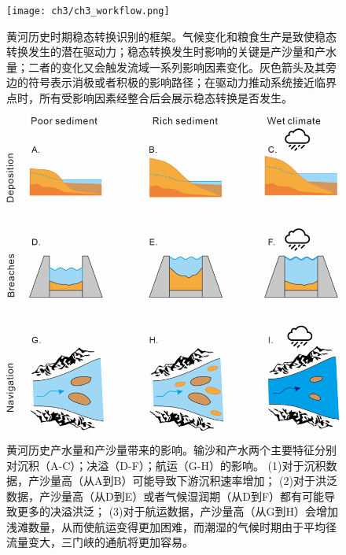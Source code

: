 
\begin{figure}[H] %
    \centering
    \texttt{[image: ch3/ch3\_workflow.png]}
    \caption[黄河历史时期稳态转换识别的框架]{黄河历史时期稳态转换识别的框架。气候变化和粮食生产是致使稳态转换发生的潜在驱动力；稳态转换发生时影响的关键是产沙量和产水量；二者的变化又会触发流域一系列影响因素变化。灰色箭头及其旁边的符号表示消极或者积极的影响路径；在驱动力推动系统接近临界点时，所有受影响因素经整合后会展示稳态转换是否发生。}
    \label{fig:ch3_regime_shift_detect}
\end{figure}

\begin{figure}[H] %
    \centering
    \includegraphics{img/ch3/ch3_impacts.png}
    \caption[黄河历史产水量和产沙量带来的影响]{黄河历史产水量和产沙量带来的影响。输沙和产水两个主要特征分别对沉积（A-C）；决溢（D-F）；航运（G-H）的影响。
    (1)对于沉积数据，产沙量高（从A到B）可能导致下游沉积速率增加\cite{xu2003a}；
    (2)对于洪泛数据，产沙量高（从D到E）或者气候湿润期（从D到F）都有可能导致更多的决溢洪泛\cite{chen2012}；
    (3)对于航运数据，产沙量高（从G到H）会增加浅滩数量，从而使航运变得更加困难，而潮湿的气候时期由于平均径流量变大，三门峡的通航将更加容易\cite{WangShouChun1993}。}
    \label{fig:ch3_impacts}
\end{figure}

